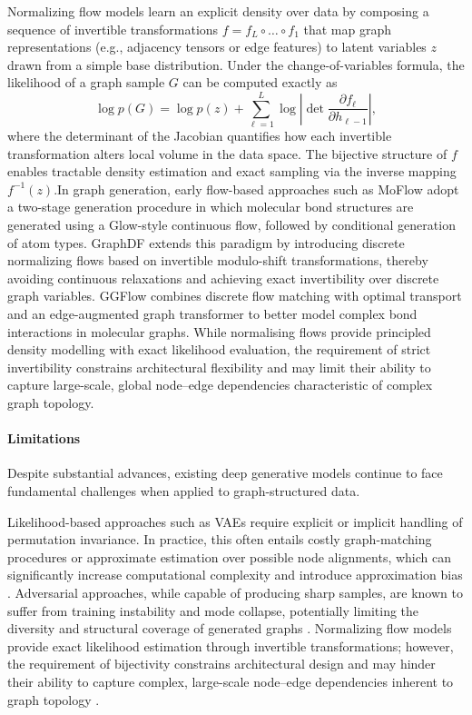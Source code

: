 Normalizing flow models learn an explicit density over data by
composing a sequence of invertible transformations
$f = f_L \circ \dots \circ f_1$ that map graph representations
(e.g., adjacency tensors or edge features) to latent variables
$z$ drawn from a simple base distribution.
Under the change-of-variables formula, the likelihood of a graph
sample $G$ can be computed exactly as
\[
\log p(G)
=
\log p(z)
+
\sum_{\ell=1}^{L}
\log \left| \det
\frac{\partial f_\ell}{\partial h_{\ell-1}}
\right|,
\]
where the determinant of the Jacobian quantifies how each
invertible transformation alters local volume in the data space.
The bijective structure of $f$ enables tractable density estimation
and exact sampling via the inverse mapping $f^{-1}(z)$.In graph generation, early flow-based approaches such as
MoFlow \citep{zang2020moflow}
adopt a two-stage generation procedure in which molecular
bond structures are generated using a Glow-style continuous flow,
followed by conditional generation of atom types.
GraphDF \citep{lu2022graphdf} extends this paradigm by
introducing discrete normalizing flows based on invertible
modulo-shift transformations, thereby avoiding continuous
relaxations and achieving exact invertibility over discrete
graph variables. GGFlow \citep{hou2024improving} combines
discrete flow matching with optimal transport and an
edge-augmented graph transformer to better model complex
bond interactions in molecular graphs. While normalising flows provide principled density modelling
with exact likelihood evaluation, the requirement of strict
invertibility constrains architectural flexibility and may limit
their ability to capture large-scale, global node–edge
dependencies characteristic of complex graph topology.


\paragraph{Limitations}

Despite substantial advances, existing deep generative models
continue to face fundamental challenges when applied to
graph-structured data.

Likelihood-based approaches such as VAEs require
explicit or implicit handling of permutation invariance.
In practice, this often entails costly graph-matching procedures
or approximate estimation over possible node alignments,
which can significantly increase computational complexity
and introduce approximation bias \citep{simonovsky2018graphvae}.
Adversarial approaches, while capable of producing sharp samples,
are known to suffer from training instability and mode collapse,
potentially limiting the diversity and structural coverage of
generated graphs \citep{de2018molgan}.
Normalizing flow models provide exact likelihood estimation
through invertible transformations; however, the requirement
of bijectivity constrains architectural design and may hinder
their ability to capture complex, large-scale node–edge
dependencies inherent to graph topology \citep{cornish2020relaxing}.

